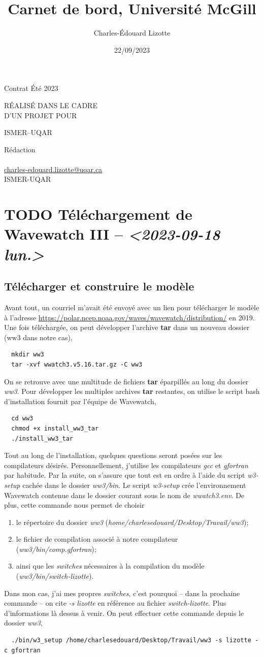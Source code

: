 \documentclass[10pt]{article}
\author{Charles-Édouard Lizotte}
\date{22/09/2023}
\title{Carnet de bord, Université McGill}
\makeatletter
\numberwithin{equation}{section}
\newcommand{\mytitlepage}{
\begin{titlepage}
\begin{center}
{\Large Contrat Été 2023 \par}
\vspace{2cm}
{\Large \MakeUppercase{\thetitle} \par}
\vspace{2cm}
RÉALISÉ DANS LE CADRE\\ D'UN PROJET POUR \par
\vspace{2cm}
{\Large ISMER--UQAR \par}
\vspace{2cm}
{\thedate}
\end{center}
\vfill
Rédaction \\
{\theauthor}\\
\url{charles-edouard.lizotte@uqar.ca}\\
ISMER-UQAR
\end{titlepage}
}
\makeatother
\begin{document}
\mytitlepage
\tableofcontents\newpage

\section{{\bfseries\sffamily TODO} Téléchargement de Wavewatch III -- \textit{<2023-09-18 lun.>}}
\label{sec:org73c78d9}
\subsection{Télécharger et construire le modèle}
\label{sec:orgb0e51b4}
Avant tout, un courriel m'avait été envoyé avec un lien pour télécharger le modèle à l'adresse \url{https://polar.ncep.noaa.gov/waves/wavewatch/distribution/} en 2019.
Une fois téléchargée, on peut développer l'archive \textbf{tar} dans un nouveau dossier (ww3 dans notre cas),
\begin{verbatim}
  mkdir ww3
  tar -xvf wwatch3.v5.16.tar.gz -C ww3
\end{verbatim}
On se retrouve avec une multitude de fichiers \textbf{tar} éparpillés au long du dossier \emph{ww3}. 
Pour développer les multiples archives \textbf{tar} restantes, on utilise le script bash d'installation fournit par l'équipe de Wavewatch,
\begin{verbatim}
  cd ww3
  chmod +x install_ww3_tar 
  ./install_ww3_tar 
\end{verbatim}
Tout au long de l'installation, quelques questions seront posées sur les compilateurs désirés. Personnellement, j'utilise les compilateurs \emph{gcc} et \emph{gfortran} par habitude.
Par la suite, on s'assure que tout est en ordre à l'aide du script \emph{w3-setup} cachée dans le dossier \emph{ww3/bin}.
Le script \emph{w3-setup} crée l'environnement Wavewatch contenue dans le dossier courant sous le nom de \emph{wwatch3.env}.
De plus, cette commande nous permet de choisir
\begin{enumerate}
\item le répertoire du dossier \emph{ww3} (\emph{home/charlesedouard/Desktop/Travail/ww3});
\item le fichier de compilation associé à notre compilateur (\emph{ww3/bin/comp.gfortran});
\item ainsi que les \emph{switches} nécessaires à la compilation du modèle (\emph{ww3/bin/switch-lizotte}).
\end{enumerate}
Dans mon cas, j'ai mes propres \emph{switches}, c'est pourquoi -- dans la prochaine commande -- on cite \emph{-s lizotte} en référence au fichier \emph{switch-lizotte}.
Plus d'informations là dessus à venir. 
On peut effectuer cette commande depuis le dossier \emph{ww3},
\begin{verbatim}
  ./bin/w3_setup /home/charlesedouard/Desktop/Travail/ww3 -s lizotte -c gfortran
\end{verbatim}
\end{document}
